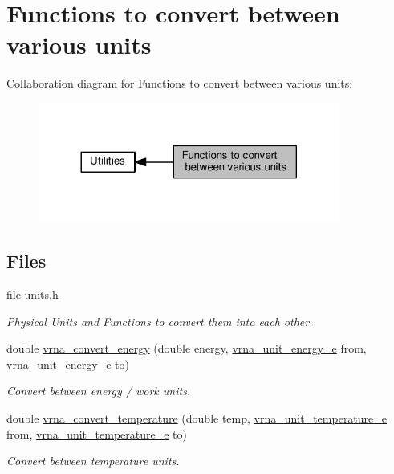 \hypertarget{group__units}{}\section{Functions to convert between various units}
\label{group__units}
Collaboration diagram for Functions to convert between various units\+:
\nopagebreak
\begin{figure}[H]
\begin{center}
\leavevmode
\includegraphics[width=281pt]{group__units}
\end{center}
\end{figure}
\subsection*{Files}
\begin{DoxyCompactItemize}
\item 
file \hyperlink{units_8h}{units.\+h}
\begin{DoxyCompactList}\small\item\em Physical Units and Functions to convert them into each other. \end{DoxyCompactList}\end{DoxyCompactItemize}
\begin{DoxyCompactItemize}
\item 
double \hyperlink{group__units_gada3216e97b410928ba19a4487e5fe6f2}{vrna\+\_\+convert\+\_\+energy} (double energy, \hyperlink{group__units_ga1d2fd1e73caf995e4dc69072b33e6ba5}{vrna\+\_\+unit\+\_\+energy\+\_\+e} from, \hyperlink{group__units_ga1d2fd1e73caf995e4dc69072b33e6ba5}{vrna\+\_\+unit\+\_\+energy\+\_\+e} to)
\begin{DoxyCompactList}\small\item\em Convert between energy / work units. \end{DoxyCompactList}\item 
double \hyperlink{group__units_gaf1bb1db32eba33b9f306214f5955d0c2}{vrna\+\_\+convert\+\_\+temperature} (double temp, \hyperlink{group__units_gadeca8d9e91ef85f1b652cc8aef63d7e4}{vrna\+\_\+unit\+\_\+temperature\+\_\+e} from, \hyperlink{group__units_gadeca8d9e91ef85f1b652cc8aef63d7e4}{vrna\+\_\+unit\+\_\+temperature\+\_\+e} to)
\begin{DoxyCompactList}\small\item\em Convert between temperature units. \end{DoxyCompactList}\end{DoxyCompactItemize}


